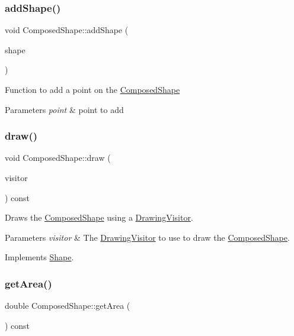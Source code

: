 \subsubsection{\texorpdfstring{add\+Shape()}{addShape()}}
{\footnotesize\ttfamily void Composed\+Shape\+::add\+Shape (\begin{DoxyParamCaption}\item[{\hyperlink{class_shape}{Shape} $\ast$}]{shape }\end{DoxyParamCaption})}

Function to add a point on the \hyperlink{class_composed_shape}{Composed\+Shape} 
\begin{DoxyParams}{Parameters}
{\em point} & point to add \\
\hline
\end{DoxyParams}
\hypertarget{class_composed_shape_a30f69734aa983bca56574ff4e5fd1723}{}\label{class_composed_shape_a30f69734aa983bca56574ff4e5fd1723} 
\subsubsection{\texorpdfstring{draw()}{draw()}}
{\footnotesize\ttfamily void Composed\+Shape\+::draw (\begin{DoxyParamCaption}\item[{\hyperlink{class_drawing_visitor}{Drawing\+Visitor} $\ast$}]{visitor }\end{DoxyParamCaption}) const\hspace{0.3cm}{\ttfamily [virtual]}}

Draws the \hyperlink{class_composed_shape}{Composed\+Shape} using a \hyperlink{class_drawing_visitor}{Drawing\+Visitor}. 
\begin{DoxyParams}{Parameters}
{\em visitor} & The \hyperlink{class_drawing_visitor}{Drawing\+Visitor} to use to draw the \hyperlink{class_composed_shape}{Composed\+Shape}. \\
\hline
\end{DoxyParams}


Implements \hyperlink{class_shape_ae67fc6d39dd33759b65ff6112b21eab7}{Shape}.

\hypertarget{class_composed_shape_a89b3457e1699afeb86805afad627d2c7}{}\label{class_composed_shape_a89b3457e1699afeb86805afad627d2c7} 
\subsubsection{\texorpdfstring{get\+Area()}{getArea()}}
{\footnotesize\ttfamily double Composed\+Shape\+::get\+Area (\begin{DoxyParamCaption}{ }\end{DoxyParamCaption}) const\hspace{0.3cm}{\ttfamily [virtual]}}

